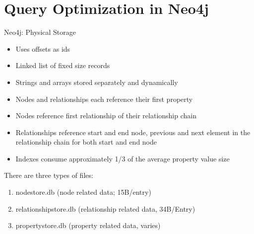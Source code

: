 \documentclass[rgb]{beamer}
\begin{document}
\section{Query Optimization in Neo4j}
    \begin{frame}[allowframebreaks]{Neo4j: Physical Storage}
        \begin{itemize}
            \item Uses offsets as ids
            \item Linked list of fixed size records
            \item Strings and arrays stored separately and dynamically
            \item Nodes and relationships each reference their first property
            \item Nodes reference first relationship of their relationship chain
            \item Relationships reference start and end node, previous and next element in the relationship chain for both start and end node
            \item Indexes consume approximately 1/3 of the average property value size
        \end{itemize}
        \framebreak
        There are three types of files:
        \begin{enumerate}
            \item nodestore.db (node related data; 15B/entry)
            \item relationshipstore.db (relationship related data, 34B/Entry)
            \item propertystore.db (property related data, varies)
        \end{enumerate}
    \end{frame}
\end{document}
